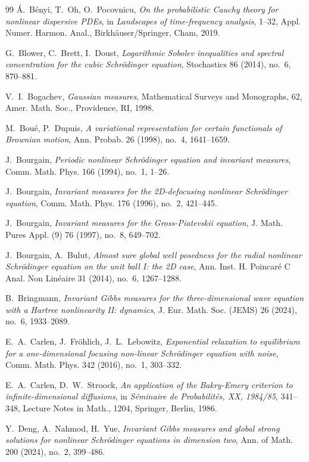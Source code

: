 \documentclass[letterpaper, 11pt,  reqno]{amsart}
\theoremstyle{definition}
\newcommand{\1}{\mathbbm 1}
\newcommand{\0}{\mathbf 0}
\numberwithin{equation}{section}
\numberwithin{theorem}{section}
\begin{document}
\begin{thebibliography}{99}
\'A.~B\'enyi, T.~Oh, O.~Pocovnicu, 
{\it On the probabilistic Cauchy theory for nonlinear dispersive PDEs}, 
in {\it Landscapes of time-frequency analysis}, 1--32, Appl. Numer. Harmon. Anal., Birkh\"auser/Springer, Cham, 2019.
 
G.~Blower, C.~Brett, I.~Doust, {\it Logarithmic Sobolev inequalities and spectral concentration for the cubic Schr\"odinger equation}, Stochastics  86 (2014), no.~6, 870--881.
 
V.~I.~Bogachev, 
{\it Gaussian measures}, Mathematical Surveys and Monographs, 62, Amer. Math. Soc., Providence, RI, 1998.
 
M.~Bou\'e, P.~Dupuis,
{\it A variational representation for certain functionals of Brownian motion},
Ann. Probab. 26 (1998), no.~4, 1641--1659.
 
J.~Bourgain, 
{\it Periodic nonlinear Schr\"odinger equation and invariant measures},
Comm. Math. Phys. 166 (1994), no.~1, 1--26.
 
J.~Bourgain, 
{\it Invariant measures for the 2D-defocusing nonlinear Schr\"odinger equation}, 
Comm. Math. Phys. 176 (1996), no.~2, 421--445.
 
J.~Bourgain, 
{\it Invariant measures for the Gross-Piatevskii equation}, 
J. Math. Pures Appl. (9) 76 (1997), no.~8, 649--702.
 
J.~Bourgain, A.~Bulut,
{\it Almost sure global well posedness for the radial nonlinear Schr\"odinger equation on the unit ball I: the 2D case},
Ann. Inst. H. Poincar\'e C Anal. Non Lin\'eaire 31 (2014), no.~6, 1267--1288.
 
B.~Bringmann, 
{\it Invariant Gibbs measures for the three-dimensional wave equation with a Hartree nonlinearity II: dynamics},
 J. Eur. Math. Soc. (JEMS) 26 (2024), no.~6, 1933--2089.
 
E.~A.~Carlen, J.~Fr\"ohlich, J.~L.~Lebowitz, 
{\it Exponential relaxation to equilibrium for a one-dimensional focusing non-linear Schr\"odinger equation with noise}, 
Comm. Math. Phys. 342 (2016), no.~1, 303--332. 
 
E.~A.~Carlen, D.~W.~Stroock, {\it An application of the Bakry-Emery criterion to infinite-dimensional diffusions}, in {\it S\'eminaire de Probabilit\'es, XX, 1984/85}, 341--348, Lecture Notes in Math., 1204, Springer, Berlin, 1986.
 
Y.~Deng, A.~Nahmod, H.~Yue,
{\it Invariant Gibbs measures and global strong solutions for nonlinear Schr\"odinger equations in dimension two}, 
Ann. of Math. 200 (2024), no.~2, 399--486.
 

\end{thebibliography}
\end{document}
